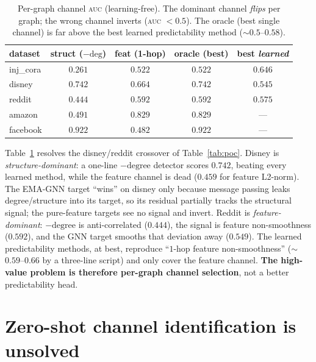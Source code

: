 \documentclass[11pt]{article}
\newcommand{\auc}{\textsc{auc}}
\begin{document}
\begin{table}[t]
\centering
\caption{Per-graph channel \auc{} (learning-free). The dominant channel \emph{flips} per graph;
the wrong channel inverts (\auc{} $<0.5$). The oracle (best single channel) is far above the
best learned predictability method (${\sim}0.5$--$0.58$).}
\label{tab:channels}
\begin{tabular}{lcccc}
\toprule
dataset & struct ($-\text{deg}$) & feat (1-hop) & oracle (best) & best \emph{learned} \\
\midrule
inj\_cora & $0.261$ & $0.522$ & $0.522$ & $0.646$ \\
disney   & $\mathbf{0.742}$ & $0.664$ & $\mathbf{0.742}$ & $0.545$ \\
reddit   & $0.444$ & $0.592$ & $0.592$ & $0.575$ \\
amazon   & $0.491$ & $\mathbf{0.829}$ & $\mathbf{0.829}$ & --- \\
facebook & $\mathbf{0.922}$ & $0.482$ & $\mathbf{0.922}$ & --- \\
\bottomrule
\end{tabular}
\end{table}

Table~\ref{tab:channels} resolves the disney/reddit crossover of Table~\ref{tab:poc}. Disney is
\emph{structure-dominant}: a one-line $-\text{degree}$ detector scores $0.742$, beating every
learned method, while the feature channel is dead ($0.459$ for feature L2-norm). The EMA-GNN
target ``wins'' on disney only because message passing leaks degree/structure into its target,
so its residual partially tracks the structural signal; the pure-feature targets see no signal
and invert. Reddit is \emph{feature-dominant}: $-\text{degree}$ is anti-correlated ($0.444$),
the signal is feature non-smoothness ($0.592$), and the GNN target smooths that deviation away
($0.549$). The learned predictability methods, at best, reproduce ``$1$-hop feature
non-smoothness'' ($\sim$$0.59$--$0.66$ by a three-line script) and only cover the feature
channel. \textbf{The high-value problem is therefore per-graph channel selection}, not a better
predictability head.

\section{Zero-shot channel identification is unsolved}
\label{sec:zeroshot}
\end{document}
